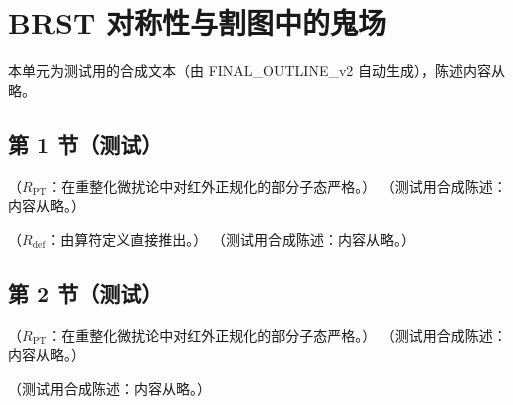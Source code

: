 \chapter{BRST 对称性与割图中的鬼场}\label{app:appJ}
本单元为测试用的合成文本（由 FINAL\_OUTLINE\_v2 自动生成），陈述内容从略。

\section{第 1 节（测试）}\label{sec:appJ-brst}

\begin{proposition}\label{prop:appJ-ghost-cuts}
（$R_{\mathrm{PT}}$：在重整化微扰论中对红外正规化的部分子态严格。）
（测试用合成陈述：内容从略。）
\end{proposition}

\begin{lemma}\label{lem:appJ-cut-hermiticity}
（$R_{\mathrm{def}}$：由算符定义直接推出。）
（测试用合成陈述：内容从略。）
\end{lemma}

\section{第 2 节（测试）}\label{sec:appJ-cuts}

\begin{proposition}\label{prop:appJ-local-operators}
（$R_{\mathrm{PT}}$：在重整化微扰论中对红外正规化的部分子态严格。）
（测试用合成陈述：内容从略。）
\end{proposition}

\begin{remark}[非定域算符]\label{rem:appJ-nonlocal}
（测试用合成陈述：内容从略。）
\end{remark}
